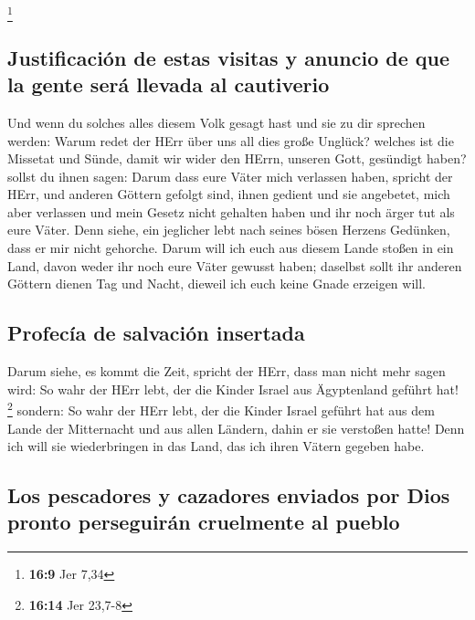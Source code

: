 \footnote{\textbf{16:9} Jer 7,34}

\hypertarget{justificaciuxf3n-de-estas-visitas-y-anuncio-de-que-la-gente-seruxe1-llevada-al-cautiverio}{%
\subsection{Justificación de estas visitas y anuncio de que la gente
será llevada al
cautiverio}\label{justificaciuxf3n-de-estas-visitas-y-anuncio-de-que-la-gente-seruxe1-llevada-al-cautiverio}}

 Und wenn du solches alles diesem Volk gesagt hast und
sie zu dir sprechen werden: Warum redet der HErr über uns all dies große
Unglück? welches ist die Missetat und Sünde, damit wir wider den HErrn,
unseren Gott, gesündigt haben?  sollst du ihnen sagen:
Darum dass eure Väter mich verlassen haben, spricht der HErr, und
anderen Göttern gefolgt sind, ihnen gedient und sie angebetet, mich aber
verlassen und mein Gesetz nicht gehalten haben  und ihr
noch ärger tut als eure Väter. Denn siehe, ein jeglicher lebt nach
seines bösen Herzens Gedünken, dass er mir nicht gehorche.
 Darum will ich euch aus diesem Lande stoßen in ein Land,
davon weder ihr noch eure Väter gewusst haben; daselbst sollt ihr
anderen Göttern dienen Tag und Nacht, dieweil ich euch keine Gnade
erzeigen will.

\hypertarget{profecuxeda-de-salvaciuxf3n-insertada}{%
\subsection{Profecía de salvación
insertada}\label{profecuxeda-de-salvaciuxf3n-insertada}}

 Darum siehe, es kommt die Zeit, spricht der HErr, dass
man nicht mehr sagen wird: So wahr der HErr lebt, der die Kinder Israel
aus Ägyptenland geführt hat! \footnote{\textbf{16:14} Jer 23,7-8}
 sondern: So wahr der HErr lebt, der die Kinder Israel
geführt hat aus dem Lande der Mitternacht und aus allen Ländern, dahin
er sie verstoßen hatte! Denn ich will sie wiederbringen in das Land, das
ich ihren Vätern gegeben habe.

\hypertarget{los-pescadores-y-cazadores-enviados-por-dios-pronto-perseguiruxe1n-cruelmente-al-pueblo}{%
\subsection{Los pescadores y cazadores enviados por Dios pronto
perseguirán cruelmente al
pueblo}\label{los-pescadores-y-cazadores-enviados-por-dios-pronto-perseguiruxe1n-cruelmente-al-pueblo}}

